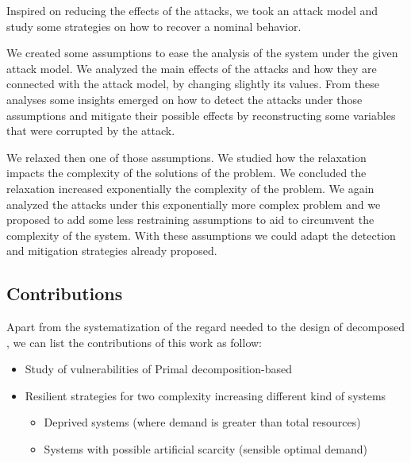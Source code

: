 \documentclass[../main.tex]{subfiles}
\begin{document}
Inspired on reducing the effects of the attacks, we took an attack model and study some strategies on how to recover a nominal behavior.

We created some assumptions to ease the analysis of the system under the given attack model.
We analyzed the main effects of the attacks and how they are connected with the attack model, by changing slightly its values.
From these analyses some insights emerged on how to detect the attacks under those assumptions and mitigate their possible effects by reconstructing some variables that were corrupted by the attack.

We relaxed then one of those assumptions.
We studied how the relaxation impacts the complexity of the solutions of the problem.
We concluded the relaxation increased exponentially the complexity of the problem.
We again analyzed the attacks under this exponentially more complex problem and we proposed to add some less restraining assumptions to aid to circumvent the complexity of the system.
With these assumptions we could adapt the detection and mitigation strategies already proposed.


\subsection{Contributions}
Apart from the systematization of the regard needed to the design of decomposed \cps{}, we can list the contributions of this work as follow:
\begin{itemize}
  \item Study of vulnerabilities of Primal decomposition-based \dmpc{}
  \item Resilient strategies for two complexity increasing different kind of systems
        \begin{itemize}
          \item Deprived systems (where demand is greater than total resources)
          \item Systems with possible artificial scarcity (sensible optimal demand)
        \end{itemize}
\end{itemize}
\end{document}
